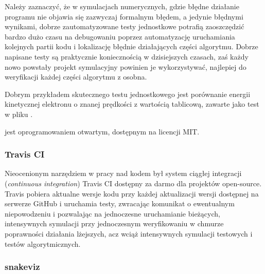 Należy zaznaczyć, że w symulacjach numerycznych, gdzie błędne działanie programu nie
objawia się zazwyczaj formalnym błędem, a jedynie błędnymi
wynikami, dobrze zautomatyzowane testy jednostkowe potrafią zaoszczędzić
bardzo dużo czasu na debugowaniu poprzez automatyzację uruchamiania
kolejnych partii kodu i lokalizację błędnie działających części algorytmu.
Dobrze napisane testy są praktycznie koniecznością w dzisiejszych czasach,
zaś każdy nowo powstały projekt symulacyjny powinien je
wykorzystywać, najlepiej do weryfikacji każdej części algorytmu z osobna.

Dobrym przykładem skutecznego testu jednostkowego jest porównanie energii kinetycznej
elektronu o znanej prędkości z wartością tablicową, zawarte jako test w pliku
.

 jest oprogramowaniem otwartym, dostępnym na licencji MIT.

\subsubsection{Travis CI}
Nieocenionym narzędziem w pracy nad kodem był system ciągłej integracji
(\emph{continuous integration}) Travis CI \cite{travisci}
dostępny za
darmo dla projektów open-source. Travis pobiera aktualne wersje kodu przy
każdej aktualizacji wersji dostępnej na serwerze GitHub i uruchamia testy,
zwracając komunikat o ewentualnym niepowodzeniu i pozwalając na jednoczesne
uruchamianie bieżących, intensywnych symulacji przy jednoczesnym
weryfikowaniu w chmurze poprawności działania lżejszych, acz wciąż intensywnych
symulacji testowych i testów algorytmicznych.

\subsubsection{snakeviz}

